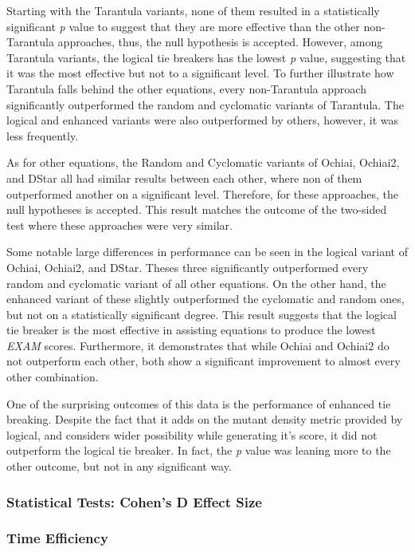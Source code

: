 Starting with the Tarantula variants, none of them resulted in a statistically
significant \emph{p} value to suggest that they are more effective than the
other non-Tarantula approaches, thus, the null hypothesis is accepted. However,
among Tarantula variants, the logical tie breakers has the lowest \emph{p}
value, suggesting that it was the most effective but not to a significant level.
To further illustrate how Tarantula falls behind the other equations, every
non-Tarantula approach significantly outperformed the random and cyclomatic
variants of Tarantula. The logical and enhanced variants were also outperformed
by others, however, it was less frequently.

As for other equations, the Random and Cyclomatic variants of Ochiai, Ochiai2,
and DStar all had similar results between each other, where non of them
outperformed another on a significant level. Therefore, for these approaches,
the null hypotheses is accepted. This result matches the outcome of the
two-sided test where these approaches were very similar.

Some notable large differences in performance can be seen in the logical variant
of Ochiai, Ochiai2, and DStar. Theses three significantly outperformed every
random and cyclomatic variant of all other equations. On the other hand, the
enhanced variant of these slightly outperformed the cyclomatic and random ones,
but not on a statistically significant degree. This result suggests that the
logical tie breaker is the most effective in assisting equations to produce the
lowest \emph{EXAM} scores. Furthermore, it demonstrates that while Ochiai and
Ochiai2 do not outperform each other, both show a significant improvement to
almost every other combination.

One of the surprising outcomes of this data is the performance of enhanced tie
breaking. Despite the fact that it adds on the mutant density metric provided by
logical, and considers wider possibility while generating it's score, it did not
outperform the logical tie breaker. In fact, the \emph{p} value was leaning more
to the other outcome, but not in any significant way.

\subsubsection{Statistical Tests: Cohen's D Effect Size}
\label{subsubsec:statistical_test_cohen}

\subsubsection{Time Efficiency}
\label{subsubsec:time_Efficiency}

